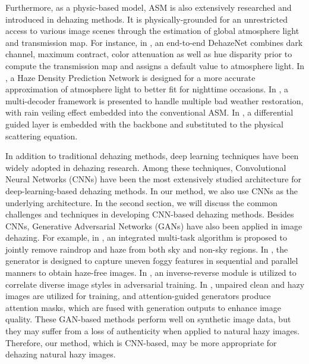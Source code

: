 \documentclass[lettersize,journal]{IEEEtran}
\begin{document}
Furthermore, as a physic-based model, ASM is also extensively researched and introduced in dehazing methods. It is physically-grounded for an unrestricted access to various image scenes through the estimation of global atmosphere light and transmission map. For instance, in \cite{cai2016dehazenet}, an end-to-end DehazeNet combines dark channel, maximum contract, color attenuation as well as hue disparity prior to compute the transmission map and assigns a default value to atmosphere light. In \cite{liao2018hdp}, a Haze Density Prediction Network is designed for a more accurate approximation of atmosphere light to better fit for nighttime occasions. In \cite{li2020all}, a multi-decoder framework is presented to handle multiple bad weather restoration, with rain veiling effect embedded into the conventional ASM. In \cite{jiao2021guided}, a differential guided layer is embedded with the backbone and substituted to the physical scattering equation.

In addition to traditional dehazing methods, deep learning techniques have been widely adopted in dehazing research. Among these techniques, Convolutional Neural Networks (CNNs) have been the most extensively studied architecture for deep-learning-based dehazing methods. In our method, we also use CNNs as the underlying architecture. In the second section, we will discuss the common challenges and techniques in developing CNN-based dehazing methods. Besides CNNs, Generative Adversarial Networks (GANs) have also been applied in image dehazing. For example, in \cite{guo2020joint}, an integrated multi-task algorithm is proposed to jointly remove raindrop and haze from both sky and non-sky regions. In \cite{li2020deep}, the generator is designed to capture uneven foggy features in sequential and parallel manners to obtain haze-free images. In \cite{ding2021perceptual}, an inverse-reverse module is utilized to correlate diverse image styles in adversarial training. In \cite{2019AttentionGAN}, unpaired clean and hazy images are utilized for training, and attention-guided generators produce attention masks, which are fused with generation outputs to enhance image quality. These GAN-based methods perform well on synthetic image data, but they may suffer from a loss of authenticity when applied to natural hazy images. Therefore, our method, which is CNN-based, may be more appropriate for dehazing natural hazy images.
\end{document}
